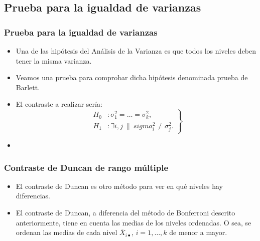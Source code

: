 \subsection{Prueba para la igualdad de varianzas}
\begin{frame}
\frametitle{Prueba para la igualdad de varianzas}
\begin{itemize}
\item<2-> Una de las hipótesis del Análisis de la Varianza es que todos los niveles deben tener la misma varianza.
\item<3-> Veamos una prueba para comprobar dicha hipótesis denominada prueba de Barlett.
\item<4-> El contraste a realizar sería:
\[
\left.
\begin{array}{ll}
H_0 &: \sigma_1^2 = \ldots = \sigma_k^2,\\
H_1 &: \exists i, j\ \|\ sigma_i^2\not = \sigma_j^2.
\end{array}
\right\}
\]
\item<5-> 
\end{itemize}
\end{frame}
\fi
\begin{frame}
\frametitle{Contraste de Duncan de rango múltiple}
\begin{itemize}
\item<2-> El contraste de Duncan es otro método para ver en qué niveles hay diferencias.
\item<3-> El contraste de Duncan, a diferencia del método de Bonferroni descrito anteriormente, tiene en cuenta las medias de los niveles ordenadas.
O sea, se ordenan las medias de cada nivel $\overline{X}_{i\bullet}$, $i=1,\ldots,k$ de menor a mayor.
\end{itemize}
\end{frame}
